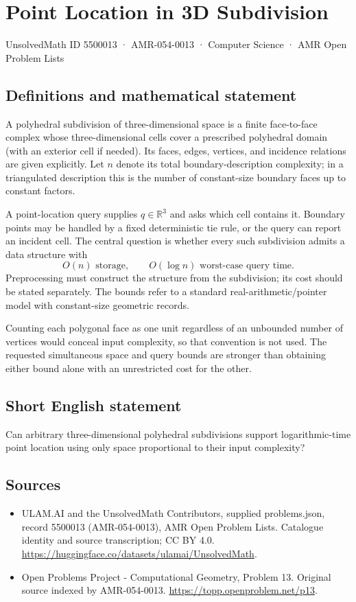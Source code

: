 \documentclass[11pt,a4paper]{article}
\begin{document}
\section*{Point Location in 3D Subdivision}\label{5500013}
{\small UnsolvedMath ID 5500013 · AMR-054-0013 · Computer Science · AMR Open Problem Lists}
\subsection{Definitions and mathematical statement}
A polyhedral subdivision of three-dimensional space is a finite
face-to-face complex whose three-dimensional cells cover a prescribed
polyhedral domain (with an exterior cell if needed). Its faces, edges,
vertices, and incidence relations are given explicitly. Let $n$ denote
its total boundary-description complexity; in a triangulated description
this is the number of constant-size boundary faces up to constant factors.

A point-location query supplies $q\in\mathbb R^3$ and asks which cell
contains it. Boundary points may be handled by a fixed deterministic
tie rule, or the query can report an incident cell. The central question
is whether every such subdivision admits a data structure with
\[
                    O(n)\text{ storage},\qquad
                    O(\log n)\text{ worst-case query time}.
\]
Preprocessing must construct the structure from the subdivision; its
cost should be stated separately. The bounds refer to a standard
real-arithmetic/pointer model with constant-size geometric records.

Counting each polygonal face as one unit regardless of an unbounded
number of vertices would conceal input complexity, so that convention
is not used. The requested simultaneous space and query bounds are
stronger than obtaining either bound alone with an unrestricted cost
for the other.
\subsection{Short English statement}
Can arbitrary three-dimensional polyhedral subdivisions support
logarithmic-time point location using only space proportional to their
input complexity?
\subsection{Sources}
\begin{itemize}
\item[S1] ULAM.AI and the UnsolvedMath Contributors, supplied problems.json, record 5500013 (AMR-054-0013), AMR Open Problem Lists. Catalogue identity and source transcription; CC BY 4.0.
\url{https://huggingface.co/datasets/ulamai/UnsolvedMath}.
\item[S2] Open Problems Project - Computational Geometry, Problem 13. Original source indexed by AMR-054-0013.
\url{https://topp.openproblem.net/p13}.
\end{itemize}
\end{document}
